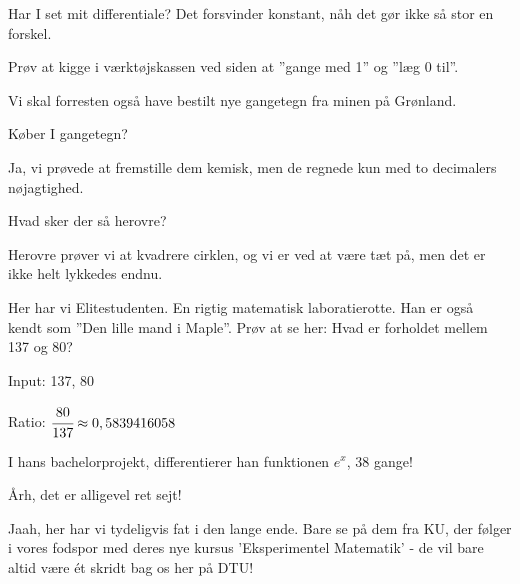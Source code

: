 \documentclass[a4paper,11pt]{article}
\begin{document}
\begin{sketch}

 Har I set mit differentiale? Det forsvinder konstant, nåh det gør ikke så stor en forskel.

 Prøv at kigge i værktøjskassen ved siden at ”gange med 1” og ”læg 0 til”.

 Vi skal forresten også have bestilt nye gangetegn fra minen på Grønland.

 Køber I gangetegn?

  Ja, vi prøvede at fremstille dem kemisk, men de regnede kun med to decimalers nøjagtighed.

 Hvad sker der så herovre?


 Herovre prøver vi at kvadrere cirklen, og vi er ved at være tæt på, men det er ikke helt lykkedes endnu.


 Her har vi Elitestudenten. En rigtig matematisk laboratierotte. Han er også kendt som ”Den lille mand i Maple”. Prøv at se her: Hvad er forholdet mellem 137 og 80?


Input: 137, 80

Ratio: $\cfrac{80}{137}\approx 0,5839416058$

 I hans bachelorprojekt, differentierer han funktionen $e^x$, 38 gange!


 Årh, det er alligevel ret sejt!

 Jaah, her har vi tydeligvis fat i den lange ende. Bare se på dem fra KU, der følger i vores fodspor med deres nye kursus 'Eksperimentel Matematik' - de vil bare altid være ét skridt bag os her på DTU!


\end{sketch}
\end{document}
